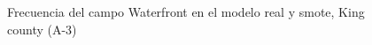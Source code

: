 \begin{figure}[H]
    \centering
    
    \caption{Frecuencia del campo Waterfront en el modelo real y smote, King county (A-3)}
    \label{frecuency-smote-waterfront}
\end{figure}